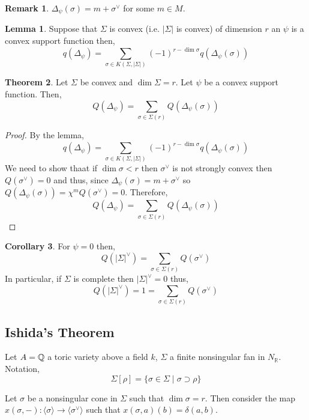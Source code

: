 \documentclass[12pt]{extarticle}
\newcommand{\R}{\mathbb{R}}
\theoremstyle{definition}
\newtheorem{theorem}{Theorem}[section]
\newtheorem{lemma}[theorem]{Lemma}
\newtheorem{corollary}[theorem]{Corollary}
\newtheorem{remark}{Remark}
\newenvironment{definition}[1][Definition:]{\begin{trivlist}
\item[\hskip \labelsep {\bfseries #1}]}{\end{trivlist}}
\newcommand{\gen}[1]{\langle #1 \rangle}
\begin{document}
\begin{remark}
$\Delta_\psi(\sigma) = m + \sigma^\vee$ for some $m \in M$. 
\end{remark}

\begin{lemma}
Suppose that $\Sigma$ is convex (i.e. $|\Sigma|$ is convex) of dimension $r$ an $\psi$ is a convex support function then,
\[ q(\Delta_\psi) = \sum_{\sigma \in K(\Sigma, |\Sigma|)} (-1)^{r - \dim{\sigma}} q(\Delta_\psi(\sigma)) \]
\end{lemma}

\begin{theorem}
Let $\Sigma$ be convex and $\dim{\Sigma} = r$. Let $\psi$ be a convex support function. Then,
\[ Q(\Delta_\psi) = \sum_{\sigma \in \Sigma(r)} Q(\Delta_\psi(\sigma)) \]
\end{theorem}

\begin{proof}
By the lemma,
\[ q(\Delta_\psi) = \sum_{\sigma \in K(\Sigma, | \Sigma |)} (-1)^{r - \dim{\sigma}} q(\Delta_\psi(\sigma)) \]
We need to show thaat if $\dim{\sigma} < r$ then $\sigma^\vee$ is not strongly convex then $Q(\sigma^\vee) = 0$ and thus, since $\Delta_\psi(\sigma) = m + \sigma^\vee$ so $Q(\Delta_\psi(\sigma)) = \chi^m Q(\sigma^\vee) = 0$. Therefore,
\[ Q(\Delta_\psi) = \sum_{\sigma \in \Sigma(r)} Q(\Delta_\psi(\sigma)) \] 
\end{proof}

\begin{corollary}
For $\psi = 0$ then,
\[ Q(|\Sigma|^\vee) = \sum_{\sigma \in \Sigma(r)} Q(\sigma^\vee) \]
In particular, if $\Sigma$ is complete then $|\Sigma|^\vee = 0$ thus,
\[ Q(|\Sigma|^\vee) = 1 = \sum_{\sigma \in \Sigma(r)} Q(\sigma^\vee) \]
\end{corollary}

\subsection{Ishida's Theorem}

Let $A = \mathbb{Q}$ a toric variety above a field $k$, $\Sigma$ a finite nonsingular fan in $N_\R$. Notation,
\[ \Sigma[\rho] = \{ \sigma \in \Sigma \mid \sigma \supset \rho \} \] 

\begin{definition}
Let $\sigma$ be a nonsingular cone in $\Sigma$ such that $\dim{\sigma} = r$. Then consider the map $x(\sigma, -) : \gen{\sigma} \to \gen{\sigma^\vee}$ such that $x(\sigma, a)(b) = \delta(a,b)$. 
\end{definition}
\end{document}
